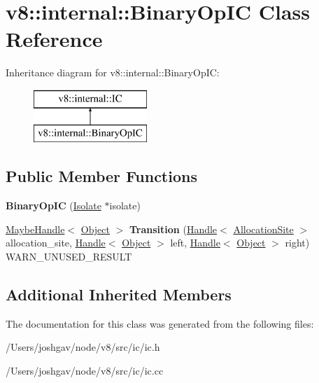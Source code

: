 \hypertarget{classv8_1_1internal_1_1_binary_op_i_c}{}\section{v8\+:\+:internal\+:\+:Binary\+Op\+IC Class Reference}
\label{classv8_1_1internal_1_1_binary_op_i_c}
Inheritance diagram for v8\+:\+:internal\+:\+:Binary\+Op\+IC\+:\begin{figure}[H]
\begin{center}
\leavevmode
\includegraphics[height=2.000000cm]{classv8_1_1internal_1_1_binary_op_i_c}
\end{center}
\end{figure}
\subsection*{Public Member Functions}
\begin{DoxyCompactItemize}
\item 
{\bfseries Binary\+Op\+IC} (\hyperlink{classv8_1_1internal_1_1_isolate}{Isolate} $\ast$isolate)\hypertarget{classv8_1_1internal_1_1_binary_op_i_c_ae4f88986c6728e0ce24b2d1e4a7c9eee}{}\label{classv8_1_1internal_1_1_binary_op_i_c_ae4f88986c6728e0ce24b2d1e4a7c9eee}

\item 
\hyperlink{classv8_1_1internal_1_1_maybe_handle}{Maybe\+Handle}$<$ \hyperlink{classv8_1_1internal_1_1_object}{Object} $>$ {\bfseries Transition} (\hyperlink{classv8_1_1internal_1_1_handle}{Handle}$<$ \hyperlink{classv8_1_1internal_1_1_allocation_site}{Allocation\+Site} $>$ allocation\+\_\+site, \hyperlink{classv8_1_1internal_1_1_handle}{Handle}$<$ \hyperlink{classv8_1_1internal_1_1_object}{Object} $>$ left, \hyperlink{classv8_1_1internal_1_1_handle}{Handle}$<$ \hyperlink{classv8_1_1internal_1_1_object}{Object} $>$ right) W\+A\+R\+N\+\_\+\+U\+N\+U\+S\+E\+D\+\_\+\+R\+E\+S\+U\+LT\hypertarget{classv8_1_1internal_1_1_binary_op_i_c_a6790eeec2e52080f65347e4665fa6e95}{}\label{classv8_1_1internal_1_1_binary_op_i_c_a6790eeec2e52080f65347e4665fa6e95}

\end{DoxyCompactItemize}
\subsection*{Additional Inherited Members}


The documentation for this class was generated from the following files\+:\begin{DoxyCompactItemize}
\item 
/\+Users/joshgav/node/v8/src/ic/ic.\+h\item 
/\+Users/joshgav/node/v8/src/ic/ic.\+cc\end{DoxyCompactItemize}
